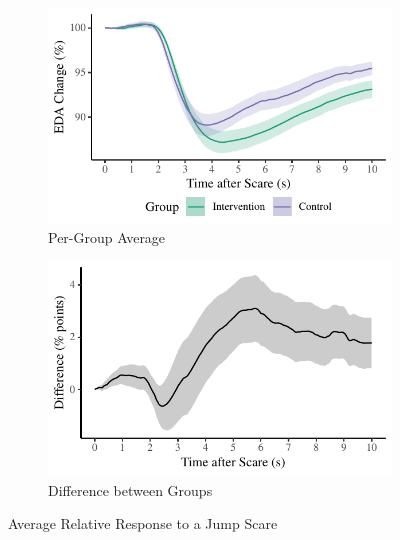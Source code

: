 \documentclass[12pt,a4paper]{article}\usepackage[]{graphicx}\usepackage[]{color}
\makeatletter
\def\maxwidth{ %
  \ifdim\Gin@nat@width>\linewidth
    \linewidth
  \else
    \Gin@nat@width
  \fi
}
\makeatother
\begin{document}
\begin{figure}[htb]
	\centering
	\begin{subfigure}[t]{.49\linewidth}


{\centering \includegraphics[width=\maxwidth]{figure/ResponseAfterScareRel-1} 

}



		\caption{Per-Group Average}
	\end{subfigure}
	\begin{subfigure}[t]{.49\linewidth}


{\centering \includegraphics[width=\maxwidth]{figure/CompareGroupsRel-1} 

}



		\caption{Difference between Groups}
	\end{subfigure}
	\caption{Average Relative Response to a Jump Scare}
	\label{fig:ResponseAfterScareRel}
\end{figure}
\end{document}
